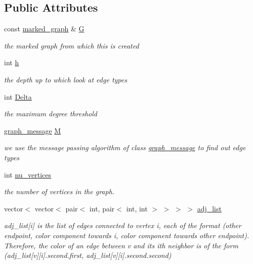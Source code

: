 \subsection*{Public Attributes}
\begin{DoxyCompactItemize}
\item 
const \hyperlink{classmarked__graph}{marked\+\_\+graph} \& \hyperlink{classcolored__graph_a39186b56cad58c368d6947656976e18d}{G}
\begin{DoxyCompactList}\small\item\em the marked graph from which this is created \end{DoxyCompactList}\item 
int \hyperlink{classcolored__graph_ae27062a4ee59df2670d3a0c81e85a3fa}{h}
\begin{DoxyCompactList}\small\item\em the depth up to which look at edge types \end{DoxyCompactList}\item 
int \hyperlink{classcolored__graph_a5b0e93eb40a20dc815c809dee11edc12}{Delta}
\begin{DoxyCompactList}\small\item\em the maximum degree threshold \end{DoxyCompactList}\item 
\hyperlink{classgraph__message}{graph\+\_\+message} \hyperlink{classcolored__graph_ab72c568fe12f7c849ca6bffb145aec47}{M}
\begin{DoxyCompactList}\small\item\em we use the message passing algorithm of class \hyperlink{classgraph__message}{graph\+\_\+message} to find out edge types \end{DoxyCompactList}\item 
int \hyperlink{classcolored__graph_a90ece8eb1fec52f3f41549ab527c1d5b}{nu\+\_\+vertices}
\begin{DoxyCompactList}\small\item\em the number of vertices in the graph. \end{DoxyCompactList}\item 
vector$<$ vector$<$ pair$<$ int, pair$<$ int, int $>$ $>$ $>$ $>$ \hyperlink{classcolored__graph_a45dce16965079286cf3f41a54a1b2ea4}{adj\+\_\+list}
\begin{DoxyCompactList}\small\item\em adj\+\_\+list\mbox{[}i\mbox{]} is the list of edges connected to vertex i, each of the format (other endpoint, color component towards i, color component towards other endpoint). Therefore, the color of an edge between v and its ith neighbor is of the form (adj\+\_\+list\mbox{[}v\mbox{]}\mbox{[}i\mbox{]}.second.\+first, adj\+\_\+list\mbox{[}v\mbox{]}\mbox{[}i\mbox{]}.second.\+second) \end{DoxyCompactList}\item 

\end{DoxyCompactItemize}
